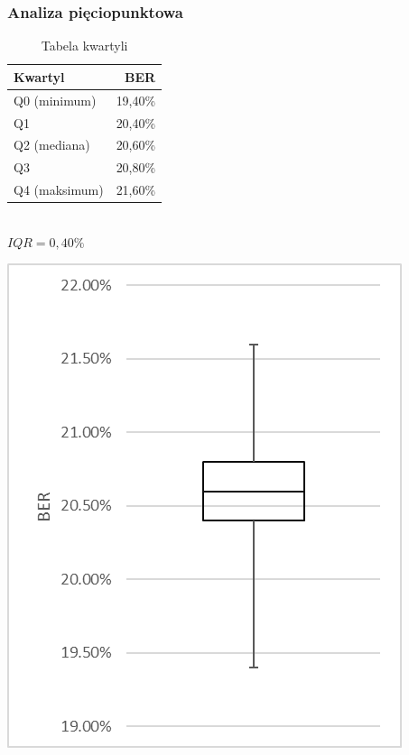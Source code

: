 \documentclass{article}
\begin{document}
		\subsubsection{Analiza pięciopunktowa}
			\begin{table}[h]
				\begin{minipage}{0.5\linewidth}
					\caption{Tabela kwartyli}
					\label{table:student}
					\centering
					\begin{tabular}{lr}
						\toprule
						Kwartyl						& BER \\
						\midrule
						Q0 (minimum)		& 19,40\% \\
						Q1    							& 20,40\% \\
						Q2 (mediana)  		& 20,60\% \\
						Q3   							& 20,80\% \\
						Q4 (maksimum)	& 21,60\% \\
						\bottomrule
					\end{tabular}\\\vspace{5mm}
					$IQR = 0,40\%$
				\end{minipage}
				\begin{minipage}{0.45\linewidth}
					\centering
					\includegraphics[width=0.8\linewidth]{img/five_64psk01.png}
					\label{ }
				\end{minipage}
			\end{table}
			
\end{document}
